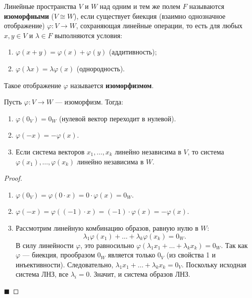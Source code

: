 \begin{definition}
Линейные пространства $V$ и $W$ над одним и тем же полем $F$ называются \textbf{изоморфными} ($V \cong W$), если существует биекция (взаимно однозначное отображение) $\varphi: V \to W$, сохраняющая линейные операции, то есть для любых $x, y \in V$ и $\lambda \in F$ выполняются условия:
\begin{enumerate}
    \item $\varphi(x + y) = \varphi(x) + \varphi(y)$ (аддитивность);
    \item $\varphi(\lambda x) = \lambda \varphi(x)$ (однородность).
\end{enumerate}
Такое отображение $\varphi$ называется \textbf{изоморфизмом}.
\end{definition}

\begin{theorem}
Пусть $\varphi: V \to W$ --- изоморфизм. Тогда:
\begin{enumerate}
    \item $\varphi(0_V) = 0_W$ (нулевой вектор переходит в нулевой).
    \item $\varphi(-x) = -\varphi(x)$.
    \item Если система векторов $x_1, \dots, x_k$ линейно независима в $V$, то система $\varphi(x_1), \dots, \varphi(x_k)$ линейно независима в $W$.
\end{enumerate}
\end{theorem}

\begin{proof}
\begin{enumerate}
    \item $\varphi(0_V) = \varphi(0 \cdot x) = 0 \cdot \varphi(x) = 0_W$.
    \item $\varphi(-x) = \varphi((-1) \cdot x) = (-1) \cdot \varphi(x) = -\varphi(x)$.
    \item Рассмотрим линейную комбинацию образов, равную нулю в $W$:
    \[
    \lambda_1 \varphi(x_1) + \dots + \lambda_k \varphi(x_k) = 0_W.
    \]
    В силу линейности $\varphi$, это равносильно $\varphi(\lambda_1 x_1 + \dots + \lambda_k x_k) = 0_W$. Так как $\varphi$ --- биекция, прообразом $0_W$ является только $0_V$ (из свойства 1 и инъективности). Следовательно, $\lambda_1 x_1 + \dots + \lambda_k x_k = 0_V$. Поскольку исходная система ЛНЗ, все $\lambda_i = 0$. Значит, и система образов ЛНЗ.
\end{enumerate}
\hfill$\blacksquare$
\end{proof}
